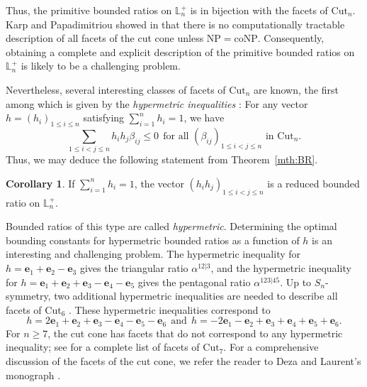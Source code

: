 \documentclass{amsart}
\theoremstyle{definition}
\newtheorem{corollary}[theorem]{Corollary}
\theoremstyle{remark}
\def\L{\mathbb{L}}
\def\Cut{\mathrm{Cut}}
\begin{document}
Thus, the primitive bounded ratios on $\L_n^+$ is in bijection with the facets of $\Cut_n$. Karp and Papadimitriou showed in  \cite{Karp-Papadimitriou}  that  there is no computationally tractable description of all facets of the cut cone  unless $\mathrm{NP}=\mathrm{coNP}$.
Consequently, obtaining a complete and explicit description of the primitive bounded ratios on $\L_n^+$ is likely to be a challenging problem.


Nevertheless, several interesting classes of facets of $\Cut_n$ are known, the first among which is given by  the \emph{hypermetric inequalities} \cite[Chapter 28]{Deza-Laurent}: For any vector $h=(h_i)_{1 \le i \le n}$ satisfying $\sum_{i=1}^n h_i=1$, we have
\[
\sum_{1 \le i < j \le n} h_ih_j \beta_{ij} \le 0 \ \ \text{for all $(\beta_{ij})_{1 \le i<j \le n}$ in $\Cut_n$.}
\]
Thus, we may deduce the following statement from Theorem~\ref{mth:BR}.

\begin{corollary}
If  $\sum_{i=1}^n h_i=1$, the vector $(h_ih_j)_{1 \le i<j\le n}$ is a reduced bounded ratio on $\L_n^+$.
\end{corollary}

Bounded ratios of this type are called \emph{hypermetric}. Determining the optimal bounding constants for hypermetric bounded ratios as a function of $h$ is an interesting and challenging problem.
The hypermetric inequality for $h=\mathbf{e}_1+\mathbf{e}_2-\mathbf{e}_3$ gives the triangular ratio $\alpha^{12|3}$, and the hypermetric inequality for $h=\mathbf{e}_1+\mathbf{e}_2+\mathbf{e}_3-\mathbf{e}_4-\mathbf{e}_5$ gives the pentagonal ratio $\alpha^{123|45}$.
Up to $S_n$-symmetry, two additional hypermetric inequalities are needed to describe all facets of $\Cut_6$ \cite[Remark 15.2.11]{Deza-Laurent}. These hypermetric inequalities correspond to 
\[
h=2\mathbf{e}_1+\mathbf{e}_2+\mathbf{e}_3-\mathbf{e}_4-\mathbf{e}_5-\mathbf{e}_6  \ \ \text{and} \ \ 
h=-2\mathbf{e}_1-\mathbf{e}_2+\mathbf{e}_3+\mathbf{e}_4+\mathbf{e}_5+\mathbf{e}_6.
\]
For $n \ge 7$, the cut cone has facets that do not correspond to any hypermetric inequality; see \cite[Section 30.6]{Deza-Laurent} for a complete list of facets of $\Cut_7$. 
For a comprehensive discussion of the facets of the cut cone, we refer the reader to Deza and Laurent’s monograph \cite[Part V]{Deza-Laurent}.
\end{document}
